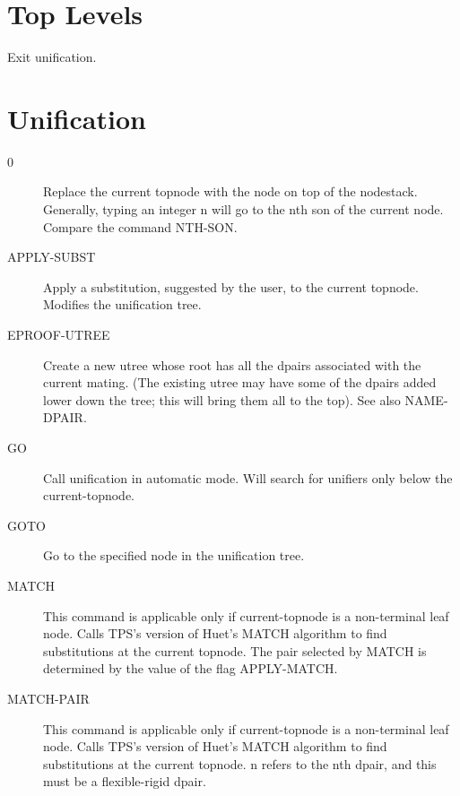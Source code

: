 \section{Top Levels}

\begin{description} 
\item[LEAVE]  
Exit unification.
\item
\end{description}

\section{Unification}

\begin{description} 
\item[0]  
Replace the current topnode with the node on top of the nodestack.
Generally, typing an integer n will go to the nth son of the current
node. Compare the command NTH-SON.

\item[APPLY-SUBST]  
Apply a substitution, suggested by the user, to the current topnode.
Modifies the unification tree.

\item[EPROOF-UTREE]  
Create a new utree whose root has all the dpairs
associated with the current mating. (The existing utree may
have some of the dpairs added lower down the tree; this will
bring them all to the top). See also NAME-DPAIR.

\item[GO]  
Call unification in automatic mode. Will search for unifiers
only below the current-topnode.

\item[GOTO]  
Go to the specified node in the unification tree.

\item[MATCH]  
This command is applicable only if current-topnode is a non-terminal
leaf node. Calls TPS's version of Huet's MATCH algorithm to find substitutions
at the current topnode. The pair selected by MATCH is determined by the value 
of the flag APPLY-MATCH.

\item[MATCH-PAIR]  
This command is applicable only if current-topnode is a non-terminal
leaf node. Calls TPS's version of Huet's MATCH algorithm to find 
substitutions at the current topnode. n refers to the nth dpair, 
and this must be a flexible-rigid dpair.


\end{description}
